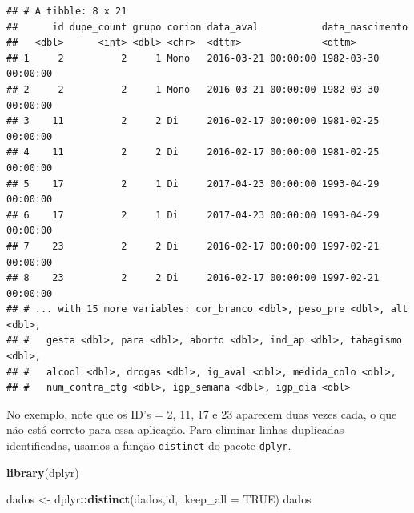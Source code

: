 \documentclass[
]{book}
\newenvironment{Shaded}{\begin{snugshade}}{\end{snugshade}}
\newcommand{\DataTypeTok}[1]{\textcolor[rgb]{0.13,0.29,0.53}{#1}}
\newcommand{\KeywordTok}[1]{\textcolor[rgb]{0.13,0.29,0.53}{\textbf{#1}}}
\newcommand{\NormalTok}[1]{#1}
\newcommand{\OperatorTok}[1]{\textcolor[rgb]{0.81,0.36,0.00}{\textbf{#1}}}
\newcommand{\OtherTok}[1]{\textcolor[rgb]{0.56,0.35,0.01}{#1}}
\newcommand{\StringTok}[1]{\textcolor[rgb]{0.31,0.60,0.02}{#1}}
\begin{document}
\begin{verbatim}
## # A tibble: 8 x 21
##      id dupe_count grupo corion data_aval           data_nascimento    
##   <dbl>      <int> <dbl> <chr>  <dttm>              <dttm>             
## 1     2          2     1 Mono   2016-03-21 00:00:00 1982-03-30 00:00:00
## 2     2          2     1 Mono   2016-03-21 00:00:00 1982-03-30 00:00:00
## 3    11          2     2 Di     2016-02-17 00:00:00 1981-02-25 00:00:00
## 4    11          2     2 Di     2016-02-17 00:00:00 1981-02-25 00:00:00
## 5    17          2     1 Di     2017-04-23 00:00:00 1993-04-29 00:00:00
## 6    17          2     1 Di     2017-04-23 00:00:00 1993-04-29 00:00:00
## 7    23          2     2 Di     2016-02-17 00:00:00 1997-02-21 00:00:00
## 8    23          2     2 Di     2016-02-17 00:00:00 1997-02-21 00:00:00
## # ... with 15 more variables: cor_branco <dbl>, peso_pre <dbl>, alt <dbl>,
## #   gesta <dbl>, para <dbl>, aborto <dbl>, ind_ap <dbl>, tabagismo <dbl>,
## #   alcool <dbl>, drogas <dbl>, ig_aval <dbl>, medida_colo <dbl>,
## #   num_contra_ctg <dbl>, igp_semana <dbl>, igp_dia <dbl>
\end{verbatim}

No exemplo, note que os ID's = 2, 11, 17 e 23 aparecem duas vezes cada, o que não está correto para essa aplicação.
Para eliminar linhas duplicadas identificadas, usamos a função \texttt{distinct} do pacote \texttt{dplyr}.

\begin{Shaded}
\begin{Highlighting}[]
\KeywordTok{library}\NormalTok{(dplyr)}
\end{Highlighting}
\end{Shaded}

\begin{Shaded}
\begin{Highlighting}[]
\NormalTok{dados <-}\StringTok{ }\NormalTok{dplyr}\OperatorTok{::}\KeywordTok{distinct}\NormalTok{(dados,id, }\DataTypeTok{.keep_all =} \OtherTok{TRUE}\NormalTok{)}
\NormalTok{dados}
\end{Highlighting}
\end{Shaded}
\end{document}
